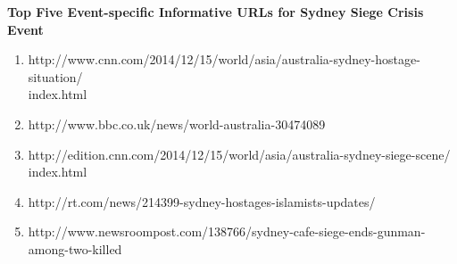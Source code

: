 \textbf{Top Five Event-specific Informative URLs for Sydney Siege Crisis Event}
\begin{enumerate}
\item http://www.cnn.com/2014/12/15/world/asia/australia-sydney-hostage-situation/\\index.html
\item http://www.bbc.co.uk/news/world-australia-30474089
\item http://edition.cnn.com/2014/12/15/world/asia/australia-sydney-siege-scene/\\index.html
\item http://rt.com/news/214399-sydney-hostages-islamists-updates/ 
\item http://www.newsroompost.com/138766/sydney-cafe-siege-ends-gunman-among-two-killed                                                                                                                                                                                                                                                                                                                                                                                                                                                                                                                
\end{enumerate}





